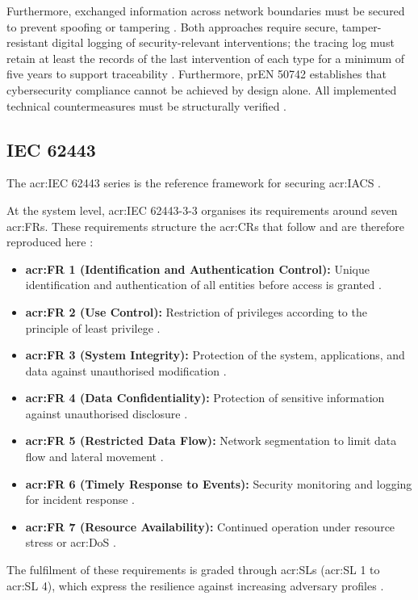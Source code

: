Furthermore, exchanged information across network boundaries must be secured to prevent spoofing or tampering \cite[p. 50]{prEN50742_2025}. Both approaches require secure, tamper-resistant digital logging of security-relevant interventions; the tracing log must retain at least the records of the last intervention of each type for a minimum of five years to support traceability \cite[p. 19, 23]{prEN50742_2025}. Furthermore, prEN 50742 establishes that cybersecurity compliance cannot be achieved by design alone. All implemented technical countermeasures must be structurally verified \cite[p. 14]{prEN50742_2025}.


\subsection{IEC 62443} 
\label{subsec:iec_62443} 

The \gls{acr:IEC} 62443 series is the reference framework for securing \gls{acr:IACS} \cite[p. 13]{IEC62443-3-3}. 

At the system level, \gls{acr:IEC} 62443-3-3 organises its requirements around seven \glspl{acr:FR}. These requirements structure the \glspl{acr:CR} that follow and are therefore reproduced here \cite[p. 15]{IEC62443-3-3}:
\begin{itemize}
	\item \textbf{\gls{acr:FR} 1 (Identification and Authentication Control):} Unique identification and authentication of all entities before access is granted \cite[p. 29]{IEC62443-3-3}.
	\item \textbf{\gls{acr:FR} 2 (Use Control):} Restriction of privileges according to the principle of least privilege \cite[p. 41]{IEC62443-3-3}.
	\item \textbf{\gls{acr:FR} 3 (System Integrity):} Protection of the system, applications, and data against unauthorised modification \cite[p. 50]{IEC62443-3-3}.
	\item \textbf{\gls{acr:FR} 4 (Data Confidentiality):} Protection of sensitive information against unauthorised disclosure \cite[p. 57]{IEC62443-3-3}.
	\item \textbf{\gls{acr:FR} 5 (Restricted Data Flow):} Network segmentation to limit data flow and lateral movement \cite[p. 61]{IEC62443-3-3}.
	\item \textbf{\gls{acr:FR} 6 (Timely Response to Events):} Security monitoring and logging for incident response \cite[p. 65]{IEC62443-3-3}.
	\item \textbf{\gls{acr:FR} 7 (Resource Availability):} Continued operation under resource stress or \gls{acr:DoS} \cite[p. 67]{IEC62443-3-3}.
\end{itemize}
The fulfilment of these requirements is graded through \glspl{acr:SL} (\gls{acr:SL} 1 to \gls{acr:SL} 4), which express the resilience against increasing adversary profiles \cite[p. 16, 26]{IEC62443-3-3}.

